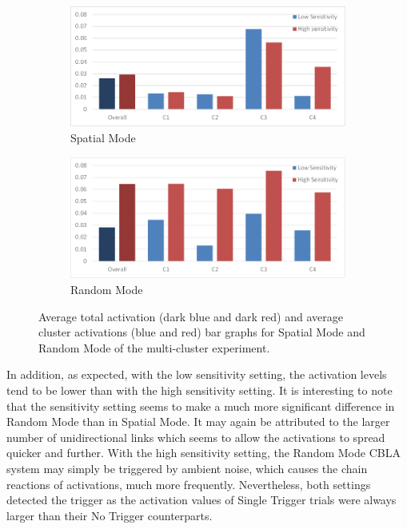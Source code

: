 \begin{figure}[!htb]
	\centering
	\begin{subfigure}[t]{0.8\textwidth}
		\centering
		\includegraphics[width=1.0 \textwidth]{"fig/validations/multi-cluster bar graph spatial"}
		\caption{Spatial Mode}
		\label{fig:multi-cluster bar graph spatial}
	\end{subfigure}
	
	\begin{subfigure}[t]{0.8\textwidth}
		\centering
		\includegraphics[width=1.0 \textwidth]{"fig/validations/multi-cluster bar graph random"}
		\caption{Random Mode}
		\label{fig:multi-cluster bar graph random}
	\end{subfigure}
	\caption[Average total activation and average cluster activations bar graphs of the multi-cluster experiment.]{Average total activation (dark blue and dark red) and average cluster activations (blue and red) bar graphs for Spatial Mode and Random Mode of the multi-cluster experiment.}
	\label{fig:multi-cluster bar graph}
\end{figure}


In addition, as expected, with the low sensitivity setting, the activation levels tend to be lower than with the high sensitivity setting. It is interesting to note that the sensitivity setting seems to make a much more significant difference in Random Mode than in Spatial Mode. It may again be attributed to the larger number of unidirectional links which seems to allow the activations to spread quicker and further. With the high sensitivity setting, the Random Mode CBLA system may simply be triggered by ambient noise, which causes the chain reactions of activations, much more frequently.
Nevertheless, both settings detected the trigger as the activation values of Single Trigger trials were always larger than their No Trigger counterparts.

